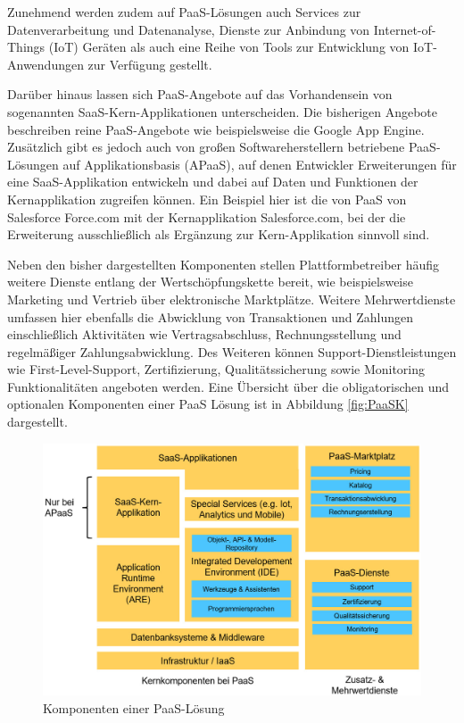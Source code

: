 Zunehmend werden zudem auf PaaS-Lösungen auch Services zur Datenverarbeitung und Datenanalyse, Dienste zur Anbindung von Internet-of-Things (IoT) Geräten als auch eine Reihe von Tools zur Entwicklung von IoT-Anwendungen zur Verfügung gestellt. \autocite[Vgl.][]{IBM2023}

Darüber hinaus lassen sich PaaS-Angebote auf das Vorhandensein von sogenannten SaaS-Kern-Applikationen unterscheiden. Die bisherigen Angebote beschreiben reine PaaS-Angebote wie beispielsweise die Google App Engine. Zusätzlich gibt es jedoch auch von großen Softwareherstellern betriebene PaaS-Lösungen auf Applikationsbasis (APaaS), auf denen Entwickler Erweiterungen für eine SaaS-Applikation entwickeln und dabei auf Daten und Funktionen der Kernapplikation zugreifen können. Ein Beispiel hier ist die von PaaS von Salesforce Force.com mit der Kernapplikation Salesforce.com, bei der die Erweiterung ausschließlich als Ergänzung zur Kern-Applikation sinnvoll sind. \autocite[Vgl.][S. 371]{BEIMBORN2011} 

Neben den bisher dargestellten Komponenten stellen Plattformbetreiber häufig weitere Dienste entlang der Wertschöpfungskette bereit, wie beispielsweise Marketing und Vertrieb über elektronische Marktplätze. Weitere Mehrwertdienste umfassen hier ebenfalls die Abwicklung von Transaktionen und Zahlungen einschließlich Aktivitäten wie Vertragsabschluss, Rechnungsstellung und regelmäßiger Zahlungsabwicklung. Des Weiteren können Support-Dienstleistungen wie First-Level-Support, Zertifizierung, Qualitätssicherung sowie Monitoring Funktionalitäten angeboten werden. \autocite[Vgl.][S. 598]{HAHN2016} Eine Übersicht über die obligatorischen und optionalen Komponenten einer PaaS Lösung ist in Abbildung \vref{fig:PaaSK} dargestellt.


\begin{figure}[h]
    \centering
    \includegraphics[width=1\textwidth]{img/PaaS_Komponenten.jpg}
    \caption[Komponenten einer PaaS-Lösung]{Komponenten einer PaaS-Lösung\autocite{PaaSK}}
    \label{fig:PaaSK}
\end{figure}

